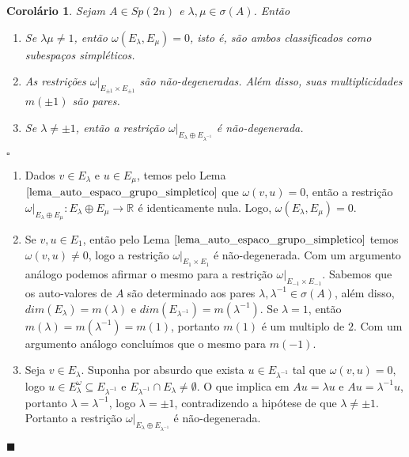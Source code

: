 \documentclass[12pt]{book}
\newtheorem{corolario}[teorema]{Corolário}
\newenvironment{prova}[1]{$\square$ #1}{\hfill$\blacksquare$}
\newcommand{\formaSimpletica}[2]{\omega(#1, #2)}
\newcommand{\gruposimpletico}[1]{Sp(#1)}
\newcommand{\real}[1]{\mathbb{R}^{#1}}
\newcommand{\reta}{\real{}}
\begin{document}
	\begin{corolario}\label{corolario_restricao_forma_simpletica}
		Sejam $A \in \gruposimpletico{2n}$ e $\lambda, \mu \in \sigma(A)$. Então 
		\begin{enumerate}
			\item Se $\lambda\mu \neq 1$, então $\formaSimpletica{E_{\lambda}}{E_{\mu}} = 0$, isto é, são ambos classificados como subespaços simpléticos.
			\item As restrições $\omega|_{E_{\pm 1}\times E_{\pm 1}}$ são não-degeneradas. Além disso, suas multiplicidades $m(\pm 1)$ são pares.
			\item Se $\lambda \neq \pm 1$, então a restrição $\omega|_{E_{\lambda} \oplus E_{\lambda^{-1}}}$ é não-degenerada.
		\end{enumerate}
	\end{corolario}
	\begin{prova}
		\begin{enumerate}
			\item Dados $v \in E_{\lambda}$ e $u \in E_{\mu}$, temos pelo Lema $\ref{lema_auto_espaco_grupo_simpletico}$ que $\formaSimpletica{v}{u} = 0$, então a restrição $\omega|_{E_{\lambda} \oplus E_{\mu}}:E_{\lambda} \oplus E_{\mu}\to \reta$ é identicamente nula. Logo, $\formaSimpletica{E_{\lambda} }{E_{\mu}} = 0$.
			\item Se $v, u \in E_{1}$, então pelo Lema $\ref{lema_auto_espaco_grupo_simpletico}$ temos $\formaSimpletica{v}{u} \neq 0$, logo a restrição  $\omega|_{E_{1}\times E_{1}}$ é não-degenerada. Com um argumento análogo podemos afirmar o mesmo para a restrição $\omega|_{E_{-1}\times E_{-1}}$. Sabemos que os auto-valores de $A$ são determinado aos pares $\lambda, \lambda^{-1} \in \sigma(A)$, além disso, $dim(E_{\lambda}) = m(\lambda)$ e $dim(E_{\lambda^{-1}})= m(\lambda^{-1})$. Se $\lambda = 1$, então $m(\lambda) = m(\lambda^{-1}) = m(1)$, portanto $m(1)$ é um multiplo de $2$. Com um argumento análogo concluímos que o mesmo para $m(-1)$.
			\item Seja $v\in E_{\lambda}$. Suponha por absurdo que exista $u \in E_{\lambda^{-1}}$ tal que $\formaSimpletica{v}{u} = 0$, logo $u \in E_{\lambda}^{\omega} \subseteq E_{\lambda^{-1}}$ e $E_{\lambda^{-1}}\cap E_{\lambda} \neq \emptyset$. O que implica em $Au= \lambda u $ e $Au =\lambda^{-1} u$, portanto $\lambda = \lambda^{-1}$, logo $\lambda = \pm 1$, contradizendo a hipótese de que $\lambda \neq \pm 1$. Portanto a restrição $\omega|_{E_{\lambda} \oplus E_{\lambda^{-1}}}$ é não-degenerada.
		\end{enumerate}
	\end{prova}
	
\end{document}
